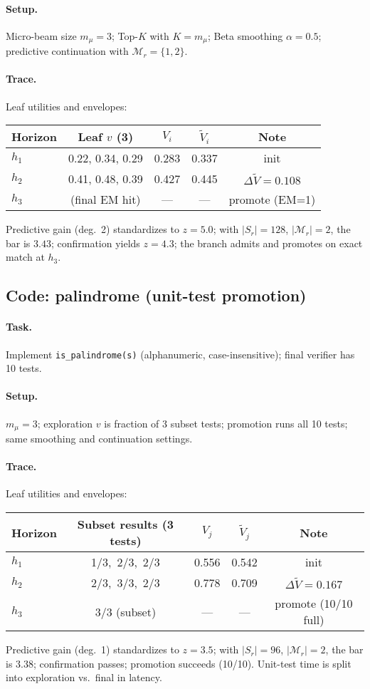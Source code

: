\documentclass{article}
\begin{document}
\paragraph{Setup.} Micro-beam size $m_\mu{=}3$; Top-$K$ with $K=m_\mu$; Beta smoothing $\alpha{=}0.5$; predictive continuation with $\mathcal{M}_r{=}\{1,2\}$.
\paragraph{Trace.} Leaf utilities and envelopes:
\begin{center}
\begin{tabular}{lcccc}
\toprule
Horizon & Leaf $v$ (3) & $V_i$ & $\tilde V_i$ & Note \\
\midrule
$h_1$ & 0.22, 0.34, 0.29 & 0.283 & 0.337 & init \\
$h_2$ & 0.41, 0.48, 0.39 & 0.427 & 0.445 & $\Delta\tilde V{=}0.108$ \\
$h_3$ & (final EM hit)   & ---    & ---    & promote (EM=1) \\
\bottomrule
\end{tabular}
\end{center}
\noindent Predictive gain (deg.\ 2) standardizes to $z{=}5.0$; with $|S_r|{=}128$, $|\mathcal{M}_r|{=}2$, the bar is $3.43$; confirmation yields $z{=}4.3$; the branch admits and promotes on exact match at $h_3$.

\subsection{Code: palindrome (unit-test promotion)}
\paragraph{Task.} Implement \texttt{is\_palindrome(s)} (alphanumeric, case-insensitive); final verifier has 10 tests.
\paragraph{Setup.} $m_\mu{=}3$; exploration $v$ is fraction of 3 subset tests; promotion runs all 10 tests; same smoothing and continuation settings.
\paragraph{Trace.} Leaf utilities and envelopes:
\begin{center}
\begin{tabular}{lcccc}
\toprule
Horizon & Subset results (3 tests) & $V_j$ & $\tilde V_j$ & Note \\
\midrule
$h_1$ & 1/3,\ 2/3,\ 2/3 & 0.556 & 0.542 & init \\
$h_2$ & 2/3,\ 3/3,\ 2/3 & 0.778 & 0.709 & $\Delta\tilde V{=}0.167$ \\
$h_3$ & 3/3 (subset)    & ---   & ---   & promote (10/10 full) \\
\bottomrule
\end{tabular}
\end{center}
\noindent Predictive gain (deg.\ 1) standardizes to $z{=}3.5$; with $|S_r|{=}96$, $|\mathcal{M}_r|{=}2$, the bar is $3.38$; confirmation passes; promotion succeeds (10/10). Unit-test time is split into exploration vs.\ final in latency.
\end{document}
